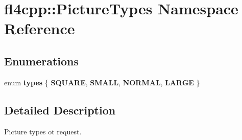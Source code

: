 \hypertarget{namespacefl4cpp_1_1_picture_types}{}\section{fl4cpp\+:\+:Picture\+Types Namespace Reference}
\label{namespacefl4cpp_1_1_picture_types}
\subsection*{Enumerations}
\begin{DoxyCompactItemize}
\item 
enum {\bfseries types} \{ {\bfseries S\+Q\+U\+A\+RE}, 
{\bfseries S\+M\+A\+LL}, 
{\bfseries N\+O\+R\+M\+AL}, 
{\bfseries L\+A\+R\+GE}
 \}\hypertarget{namespacefl4cpp_1_1_picture_types_a957e97807e3dcc9d7916b9aa6c2cd685}{}\label{namespacefl4cpp_1_1_picture_types_a957e97807e3dcc9d7916b9aa6c2cd685}

\end{DoxyCompactItemize}


\subsection{Detailed Description}
Picture types ot request. 